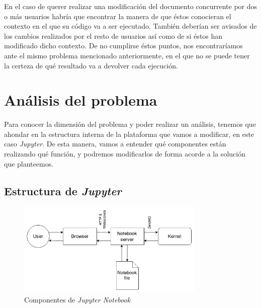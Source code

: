 \documentclass[11pt,spanish,listoffigures]{tfgetsinf}
\begin{document}
En el caso de querer realizar una modificación del documento concurrente por dos o más usuarios habría que encontrar la manera de que éstos conocieran el contexto en el que su código va a ser ejecutado. También deberían ser avisados de los cambios realizados por el resto de usuarios así como de si éstos han modificado dicho contexto. De no cumplirse éstos puntos, nos encontraríamos ante el mismo problema mencionado anteriormente, en el que no se puede tener la certeza de qué resultado va a devolver cada ejecución.




\chapter{Análisis del problema}
\label{ch:analisis-problema}

Para conocer la dimensión del problema y poder realizar un análisis, tenemos que ahondar en la estructura interna de la plataforma que vamos a modificar, en este caso \textit{Jupyter}. De esta manera, vamos a entender qué componentes están realizando qué función, y podremos modificarlos de forma acorde a la solución que planteemos.



\section{Estructura de \textit{Jupyter}}
\label{sec:estructura-jupyter}

\begin{figure}[h]
  \centering
  \includegraphics[width=0.8\textwidth]{jupy.png}
  \caption{Componentes de \textit{Jupyter Notebook}}
  \label{fig:components}
\end{figure}
\end{document}
